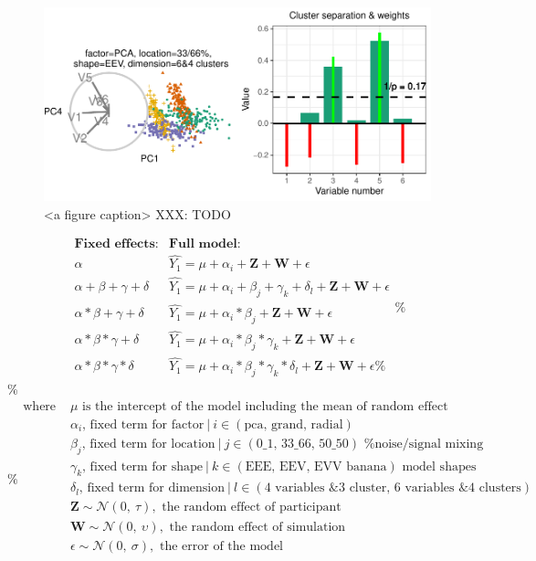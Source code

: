 \documentclass{monashthesis}
\begin{document}
\begin{figure}

{\centering \includegraphics[width=1\linewidth,]{./figures_from_script/ch4_fig3_accuracy_measure} 

}

\caption{<a figure caption> XXX: TODO}\label{fig:ch4fig3}
\end{figure}

\[
\begin{array}{ll}
\textbf{Fixed effects:}          &\textbf{Full model:} \\
\alpha                           &\widehat{Y_1} = \mu + \alpha_i + \textbf{Z} + \textbf{W} + \epsilon \\
\alpha + \beta + \gamma + \delta &\widehat{Y_1} = \mu + \alpha_i + \beta_j + \gamma_k + \delta_l + \textbf{Z} + \textbf{W} + \epsilon \\
\alpha * \beta + \gamma + \delta &\widehat{Y_1} = \mu + \alpha_i * \beta_j + \textbf{Z} + \textbf{W} + \epsilon \\
\alpha * \beta * \gamma + \delta &\widehat{Y_1} = \mu + \alpha_i * \beta_j * \gamma_k + \textbf{Z} + \textbf{W} + \epsilon \\
\alpha * \beta * \gamma * \delta &\widehat{Y_1} = \mu + \alpha_i * \beta_j * \gamma_k * \delta_l + \textbf{Z} + \textbf{W} + \epsilon
\% \end{array}
\% \]
\% \[
\% \begin{array}{ll}
\text{where } &\mu \text{ is the intercept of the model including the mean of random effect} \\
&\alpha_i \text{, fixed term for factor}~|~i\in (\text{pca, grand, radial}) \\
&\beta_j  \text{, fixed term for location}~|~j\in (\text{0\_1, 33\_66, 50\_50}) \text{ \% noise/signal mixing} \\
&\gamma_k \text{, fixed term for shape}~|~k\in (\text{EEE, EEV, EVV banana}) \text{ model shapes} \\
&\delta_l \text{, fixed term for dimension}~|~l\in (\text{4 variables \& 3 cluster, 6 variables \& 4 clusters}) \\
&\textbf{Z} \sim \mathcal{N}(0,~\tau), \text{ the random effect of participant} \\
&\textbf{W} \sim \mathcal{N}(0,~\upsilon), \text{ the random effect of simulation} \\
&\epsilon   \sim \mathcal{N}(0,~\sigma), \text{ the error of the model} \\
\end{array}
\]
\end{document}
